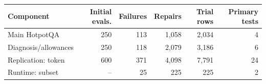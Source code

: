 \begin{tabular}{@{}lrrrrr@{}}
\toprule
Component & Initial evals. & Failures & Repairs & Trial rows & Primary tests \\
\midrule
Main HotpotQA & 250 & 113 & 1,058 & 2,034 & 4 \\
Diagnosis/allowances & 250 & 118 & 2,079 & 3,186 & 6 \\
Replication: token & 600 & 371 & 4,098 & 7,791 & 24 \\
Runtime: subset & -- & 25 & 225 & 225 & 2 \\
\bottomrule
\end{tabular}
